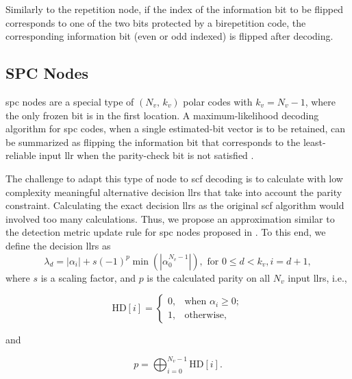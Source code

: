 \documentclass[conference]{IEEEtran}
\begin{document}
Similarly to the repetition node, if the index of the information bit to be flipped corresponds to one of the two bits protected by a birepetition code, the corresponding information bit (even or odd indexed) is flipped after decoding.

\subsection{SPC Nodes}
\Gls{spc} nodes are a special type of $(N_v,\,k_v)$ polar codes with $k_v=N_v-1$, where the only frozen bit is in the first location. A maximum-likelihood decoding algorithm for \gls{spc} codes, when a single estimated-bit vector is to be retained, can be summarized as flipping the information bit that corresponds to the least-reliable input \gls{llr} when the parity-check bit is not satisfied \cite{Silverman1954,Sarkis_JSAC_2014}.

The challenge to adapt this type of node to \gls{scf} decoding is to calculate with low complexity meaningful alternative decision \glspl{llr} that take into account the parity constraint. Calculating the exact decision \glspl{llr} as the original \gls{scf} algorithm would involved too many calculations. Thus, we propose an approximation similar to the detection metric update rule for \gls{spc} nodes proposed in \cite{Giard_SIPS_2017}. To this end, we define the decision \glspl{llr} as
\begin{equation}\label{eq:spc:decision}
  \lambda_d=\left|\alpha_i\right| + s(-1)^p\min\left(\left| \alpha_0^{N_v-1} \right| \right), \text{ for } 0 \leq d < k_v, i=d+1,
\end{equation}
where $s$ is a scaling factor, and $p$ is the calculated parity on all $N_v$ input \glspl{llr}, i.e.,

\noindent\begin{minipage}{.55\linewidth}
  \[
    \text{HD}[i] = \begin{cases}
      0, & \text{when } \alpha_i \geq 0;\\
      1, & \text{otherwise,}
    \end{cases}
  \]
\end{minipage}%
\begin{minipage}{.05\linewidth}
  and
\end{minipage}%
\begin{minipage}{.4\linewidth}
  \[
    p=\bigoplus_{i=0}^{N_v-1}\text{HD}[i].
  \]
\end{minipage}\\
\end{document}

